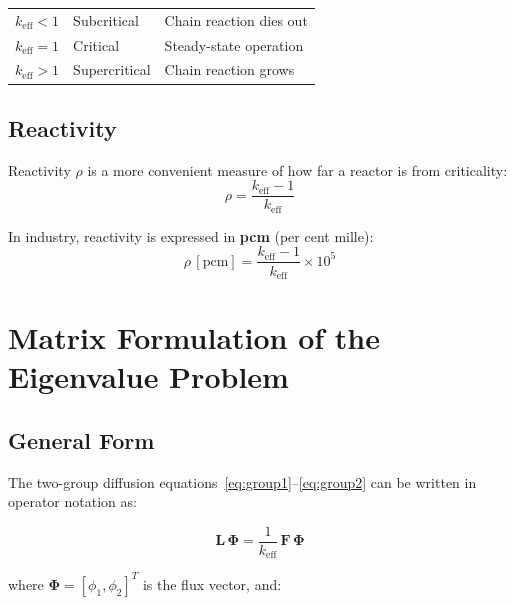 \documentclass[12pt,a4paper]{article}
\newcommand{\keff}{k_{\mathrm{eff}}}
\newcommand{\flux}[1]{\phi_{#1}}
\begin{document}
\begin{center}
\begin{tabular}{cll}
\toprule
$\keff < 1$ & Subcritical & Chain reaction dies out \\
$\keff = 1$ & Critical    & Steady-state operation \\
$\keff > 1$ & Supercritical & Chain reaction grows \\
\bottomrule
\end{tabular}
\end{center}

\subsection{Reactivity}

Reactivity $\rho$ is a more convenient measure of how far a reactor
is from criticality:
\begin{equation}
  \rho = \frac{\keff - 1}{\keff}
\end{equation}

In industry, reactivity is expressed in \textbf{pcm} (per cent mille):
\begin{equation}
  \rho\,[\text{pcm}] = \frac{\keff - 1}{\keff} \times 10^5
\end{equation}

\section{Matrix Formulation of the Eigenvalue Problem}

\subsection{General Form}

The two-group diffusion equations~\eqref{eq:group1}--\eqref{eq:group2}
can be written in operator notation as:

\begin{eqbox}
\begin{equation}
  \mathbf{L}\,\bm{\Phi} = \frac{1}{\keff}\,\mathbf{F}\,\bm{\Phi}
  \label{eq:eigenvalue}
\end{equation}
\end{eqbox}

where $\bm{\Phi} = [\flux{1}, \flux{2}]^T$ is the flux vector, and:
\end{document}
